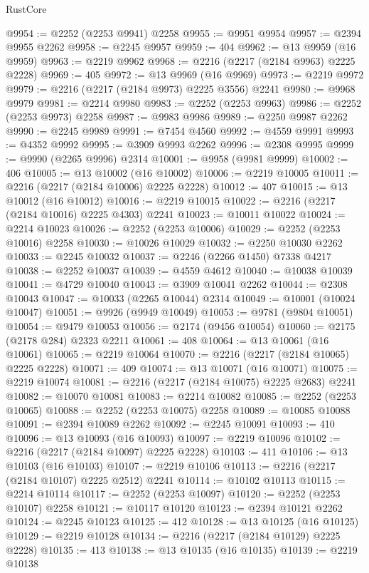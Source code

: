 \begin{lexlean}{RustCore}
\begin{coremodule}
@9954 := @2252 (@2253 @9941) @2258
@9955 := @9951 @9954
@9957 := @2394 @9955 @2262
@9958 := @2245 @9957
@9959 := 404
@9962 := @13 @9959 (@16 @9959)
@9963 := @2219 @9962
@9968 := @2216 (@2217 (@2184 @9963) @2225 @2228)
@9969 := 405
@9972 := @13 @9969 (@16 @9969)
@9973 := @2219 @9972
@9979 := @2216 (@2217 (@2184 @9973) @2225 @3556) @2241
@9980 := @9968 @9979
@9981 := @2214 @9980
@9983 := @2252 (@2253 @9963)
@9986 := @2252 (@2253 @9973) @2258
@9987 := @9983 @9986
@9989 := @2250 @9987 @2262
@9990 := @2245 @9989
@9991 := @7454 @4560
@9992 := @4559 @9991
@9993 := @4352 @9992
@9995 := @3909 @9993 @2262
@9996 := @2308 @9995
@9999 := @9990 (@2265 @9996) @2314
@10001 := @9958 (@9981 @9999)
@10002 := 406
@10005 := @13 @10002 (@16 @10002)
@10006 := @2219 @10005
@10011 := @2216 (@2217 (@2184 @10006) @2225 @2228)
@10012 := 407
@10015 := @13 @10012 (@16 @10012)
@10016 := @2219 @10015
@10022 := @2216 (@2217 (@2184 @10016) @2225 @4303) @2241
@10023 := @10011 @10022
@10024 := @2214 @10023
@10026 := @2252 (@2253 @10006)
@10029 := @2252 (@2253 @10016) @2258
@10030 := @10026 @10029
@10032 := @2250 @10030 @2262
@10033 := @2245 @10032
@10037 := @2246 (@2266 @1450) @7338 @4217
@10038 := @2252 @10037
@10039 := @4559 @4612
@10040 := @10038 @10039
@10041 := @4729 @10040
@10043 := @3909 @10041 @2262
@10044 := @2308 @10043
@10047 := @10033 (@2265 @10044) @2314
@10049 := @10001 (@10024 @10047)
@10051 := @9926 (@9949 @10049)
@10053 := @9781 (@9804 @10051)
@10054 := @9479 @10053
@10056 := @2174 (@9456 @10054)
@10060 := @2175 (@2178 @284) @2323 @2211
@10061 := 408
@10064 := @13 @10061 (@16 @10061)
@10065 := @2219 @10064
@10070 := @2216 (@2217 (@2184 @10065) @2225 @2228)
@10071 := 409
@10074 := @13 @10071 (@16 @10071)
@10075 := @2219 @10074
@10081 := @2216 (@2217 (@2184 @10075) @2225 @2683) @2241
@10082 := @10070 @10081
@10083 := @2214 @10082
@10085 := @2252 (@2253 @10065)
@10088 := @2252 (@2253 @10075) @2258
@10089 := @10085 @10088
@10091 := @2394 @10089 @2262
@10092 := @2245 @10091
@10093 := 410
@10096 := @13 @10093 (@16 @10093)
@10097 := @2219 @10096
@10102 := @2216 (@2217 (@2184 @10097) @2225 @2228)
@10103 := 411
@10106 := @13 @10103 (@16 @10103)
@10107 := @2219 @10106
@10113 := @2216 (@2217 (@2184 @10107) @2225 @2512) @2241
@10114 := @10102 @10113
@10115 := @2214 @10114
@10117 := @2252 (@2253 @10097)
@10120 := @2252 (@2253 @10107) @2258
@10121 := @10117 @10120
@10123 := @2394 @10121 @2262
@10124 := @2245 @10123
@10125 := 412
@10128 := @13 @10125 (@16 @10125)
@10129 := @2219 @10128
@10134 := @2216 (@2217 (@2184 @10129) @2225 @2228)
@10135 := 413
@10138 := @13 @10135 (@16 @10135)
@10139 := @2219 @10138

\end{coremodule}
\end{lexlean}
